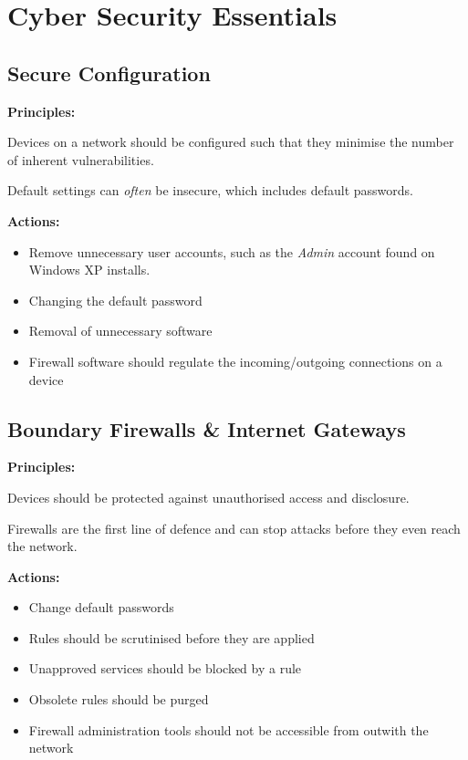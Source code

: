 \documentclass{article}
\begin{document}
\section{Cyber Security Essentials}
\filbreak
\subsection{Secure Configuration}

\textbf{Principles:}

Devices on a network should be configured such that they minimise the
number of inherent vulnerabilities.

Default settings can \textit{often} be insecure, which includes
default passwords.

\textbf{Actions:}

\begin{itemize}
\item
  Remove unnecessary user accounts, such as the \textit{Admin}
  account found on Windows XP installs.
\item
  Changing the default password
\item 
  Removal of unnecessary software
\item 
  Firewall software should regulate the incoming/outgoing connections on a device
\end{itemize}

\subsection{Boundary Firewalls \& Internet Gateways}

\textbf{Principles:}

Devices should be protected against unauthorised access and disclosure.

Firewalls are the first line of defence and can stop attacks before they even reach the network.

\textbf{Actions:}

\begin{itemize}
\item 
  Change default passwords
\item 
  Rules should be scrutinised before they are applied
\item 
  Unapproved services should be blocked by a rule
\item 
  Obsolete rules should be purged
\item 
  Firewall administration tools should not be accessible from outwith the network
\end{itemize}
\end{document}
